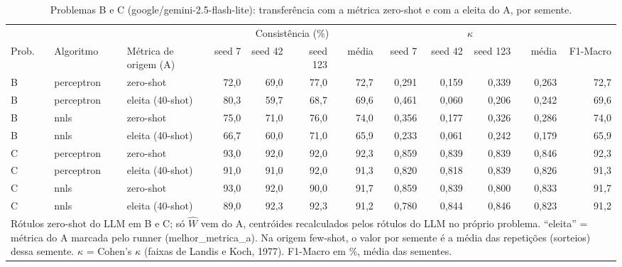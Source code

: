 \begin{table}[htbp]
\centering
\footnotesize
\caption{Problemas B e C (google/gemini-2.5-flash-lite): transferência com a métrica zero-shot e com a eleita do A, por semente.}
\label{tab:T8_transf_flashlite}
\begin{tabular}{lllrrrrrrrrr}
\toprule
 &  &  & \multicolumn{4}{c}{Consistência (\%)} & \multicolumn{4}{c}{$\kappa$} &  \\ \cmidrule(lr){4-7} \cmidrule(lr){8-11}
Prob. & Algoritmo & Métrica de origem (A) & seed 7 & seed 42 & seed 123 & média & seed 7 & seed 42 & seed 123 & média & F1-Macro \\
\midrule
B & perceptron & zero-shot & 72,0 & 69,0 & 77,0 & 72,7 & 0,291 & 0,159 & 0,339 & 0,263 & 72,7 \\
B & perceptron & eleita (40-shot) & 80,3 & 59,7 & 68,7 & 69,6 & 0,461 & 0,060 & 0,206 & 0,242 & 69,6 \\
B & nnls & zero-shot & 75,0 & 71,0 & 76,0 & 74,0 & 0,356 & 0,177 & 0,326 & 0,286 & 74,0 \\
B & nnls & eleita (40-shot) & 66,7 & 60,0 & 71,0 & 65,9 & 0,233 & 0,061 & 0,242 & 0,179 & 65,9 \\
\midrule
C & perceptron & zero-shot & 93,0 & 92,0 & 92,0 & 92,3 & 0,859 & 0,839 & 0,839 & 0,846 & 92,3 \\
C & perceptron & eleita (40-shot) & 91,0 & 91,0 & 92,0 & 91,3 & 0,820 & 0,818 & 0,839 & 0,826 & 91,3 \\
C & nnls & zero-shot & 93,0 & 92,0 & 90,0 & 91,7 & 0,859 & 0,839 & 0,800 & 0,833 & 91,7 \\
C & nnls & eleita (40-shot) & 89,0 & 92,3 & 92,3 & 91,2 & 0,780 & 0,844 & 0,846 & 0,823 & 91,2 \\
\bottomrule
\multicolumn{12}{p{0.95\linewidth}}{\footnotesize Rótulos zero-shot do LLM em B e C; só $\hat{W}$ vem do A, centróides recalculados pelos rótulos do LLM no próprio problema. ``eleita'' = métrica do A marcada pelo runner (melhor\_metrica\_a). Na origem few-shot, o valor por semente é a média das repetições (sorteios) dessa semente. $\kappa$ = Cohen's $\kappa$ (faixas de Landis e Koch, 1977). F1-Macro em \%, média das sementes.} \\
\end{tabular}
\end{table}
